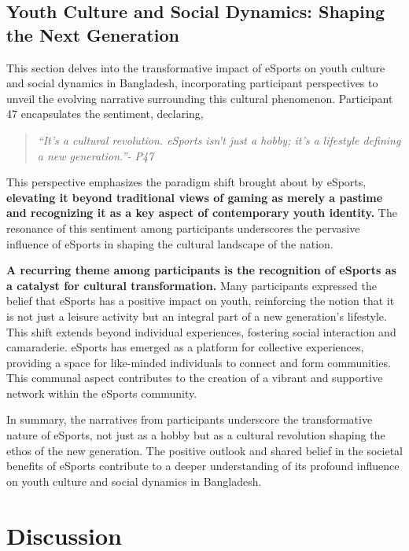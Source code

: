 \documentclass[manuscript,screen,review,anonymous]{acmart}
\begin{document}
\subsection{Youth Culture and Social Dynamics: Shaping the Next Generation}

This section delves into the transformative impact of eSports on youth culture and social dynamics in Bangladesh, incorporating participant perspectives to unveil the evolving narrative surrounding this cultural phenomenon. Participant 47 encapsulates the sentiment, declaring,

\begin{quote}
{\emph{``It's a cultural revolution. eSports isn't just a hobby; it's a lifestyle defining a new generation.''- P47}}
\end{quote}

This perspective emphasizes the paradigm shift brought about by eSports, \textbf{elevating it beyond traditional views of gaming as merely a pastime and recognizing it as a key aspect of contemporary youth identity.} The resonance of this sentiment among participants underscores the pervasive influence of eSports in shaping the cultural landscape of the nation.

\textbf{A recurring theme among participants is the recognition of eSports as a catalyst for cultural transformation.} Many participants expressed the belief that eSports has a positive impact on youth, reinforcing the notion that it is not just a leisure activity but an integral part of a new generation's lifestyle. This shift extends beyond individual experiences, fostering social interaction and camaraderie. eSports has emerged as a platform for collective experiences, providing a space for like-minded individuals to connect and form communities. This communal aspect contributes to the creation of a vibrant and supportive network within the eSports community.

In summary, the narratives from participants underscore the transformative nature of eSports, not just as a hobby but as a cultural revolution shaping the ethos of the new generation. The positive outlook and shared belief in the societal benefits of eSports contribute to a deeper understanding of its profound influence on youth culture and social dynamics in Bangladesh.




\section{Discussion}
\end{document}

